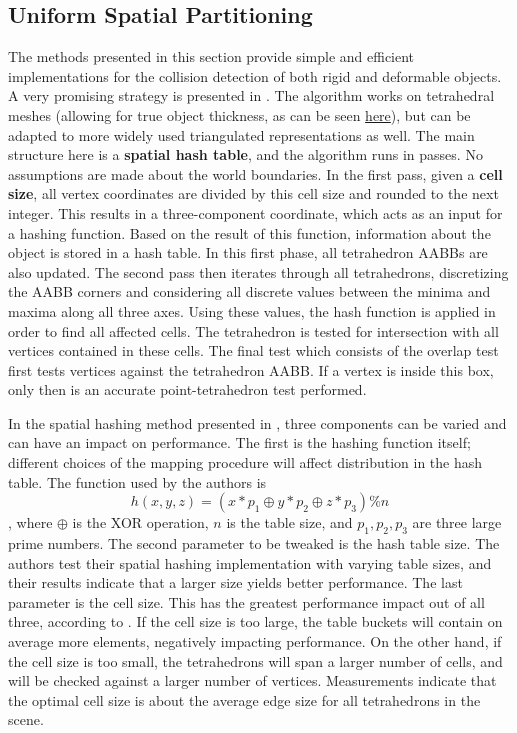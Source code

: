 \FloatBarrier
\subsection{Uniform Spatial Partitioning}
\label{sub-sec:usp}



The methods presented in this section provide simple and efficient implementations for the collision detection of both rigid and deformable objects. A very promising strategy is presented in \citep{thm03}. The algorithm works on tetrahedral meshes (allowing for true object thickness, as can be seen \hyperref[img:tetra-hash]{here}), but can be adapted to more widely used triangulated representations as well. The main structure here is a \textbf{spatial hash table}, and the algorithm runs in passes. No assumptions are made about the world boundaries. In the first pass, given a \textbf{cell size}, all vertex coordinates are divided by this cell size and rounded to the next integer. This results in a three-component coordinate, which acts as an input for a hashing function. Based on the result of this function, information about the object is stored in a hash table. In this first phase, all tetrahedron AABBs are also updated. The second pass then iterates through all tetrahedrons, discretizing the AABB corners and considering all discrete values between the minima and maxima along all three axes. Using these values, the hash function is applied in order to find all affected cells. The tetrahedron is tested for intersection with all vertices contained in these cells. The final test which consists of the overlap test first tests vertices against the tetrahedron AABB. If a vertex is inside this box, only then is an accurate point-tetrahedron test performed.


In the spatial hashing method presented in \citep{thm03}, three components can be varied and can have an impact on performance. The first is the hashing function itself; different choices of the mapping procedure will affect distribution in the hash table. The function used by the authors is \[h(x, y, z) = (x * p_{1} \oplus y * p_{2} \oplus  z * p_{3}) \% n \], where $\oplus$ is the XOR operation, $n$ is the table size, and $p_{1}, p_{2}, p_{3}$ are three large prime numbers. The second parameter to be tweaked is the hash table size. The authors test their spatial hashing implementation with varying table sizes, and their results indicate that a larger size yields better performance. The last parameter is the cell size. This has the greatest performance impact out of all three, according to \citep{thm03}. If the cell size is too large, the table buckets will contain on average more elements, negatively impacting performance. On the other hand, if the cell size is too small, the tetrahedrons will span a larger number of cells, and will be checked against a larger number of vertices. Measurements indicate that the optimal cell size is about the average edge size for all tetrahedrons in the scene.


